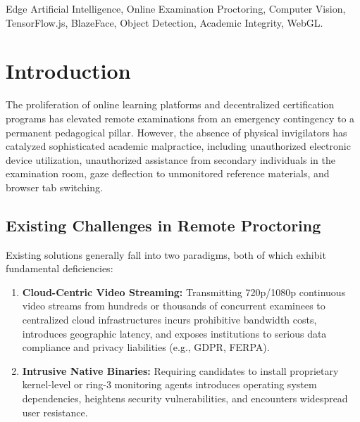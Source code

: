 \documentclass[conference]{IEEEtran}
\begin{document}
\begin{IEEEkeywords}
Edge Artificial Intelligence, Online Examination Proctoring, Computer Vision, TensorFlow.js, BlazeFace, Object Detection, Academic Integrity, WebGL.
\end{IEEEkeywords}

\section{Introduction}
The proliferation of online learning platforms and decentralized certification programs has elevated remote examinations from an emergency contingency to a permanent pedagogical pillar. However, the absence of physical invigilators has catalyzed sophisticated academic malpractice, including unauthorized electronic device utilization, unauthorized assistance from secondary individuals in the examination room, gaze deflection to unmonitored reference materials, and browser tab switching.

\subsection{Existing Challenges in Remote Proctoring}
Existing solutions generally fall into two paradigms, both of which exhibit fundamental deficiencies:
\begin{enumerate}
    \item \textbf{Cloud-Centric Video Streaming:} Transmitting 720p/1080p continuous video streams from hundreds or thousands of concurrent examinees to centralized cloud infrastructures incurs prohibitive bandwidth costs, introduces geographic latency, and exposes institutions to serious data compliance and privacy liabilities (e.g., GDPR, FERPA).
    \item \textbf{Intrusive Native Binaries:} Requiring candidates to install proprietary kernel-level or ring-3 monitoring agents introduces operating system dependencies, heightens security vulnerabilities, and encounters widespread user resistance.
\end{enumerate}
\end{document}
